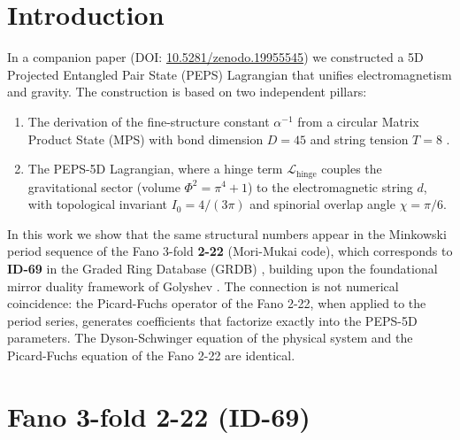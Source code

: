 \documentclass[12pt]{article}
\begin{document}
\tableofcontents

\newpage

\section{Introduction}

In a companion paper \cite{peps5d} (DOI: \href{https://doi.org/10.5281/zenodo.19955545}{10.5281/zenodo.19955545})
we constructed a 5D Projected Entangled Pair State (PEPS) Lagrangian that unifies
electromagnetism and gravity. The construction is based on two independent
pillars:

\begin{enumerate}
  \item The derivation of the fine-structure constant $\alpha^{-1}$ from a
        circular Matrix Product State (MPS) with bond dimension $D = 45$ and
        string tension $T = 8$ \cite{alpha_series}.
  \item The PEPS-5D Lagrangian, where a hinge term $\mathcal{L}_{\text{hinge}}$
        couples the gravitational sector (volume $\Phi^2 = \pi^4 + 1$) to the
        electromagnetic string $d$, with topological invariant $I_0 = 4/(3\pi)$
        and spinorial overlap angle $\chi = \pi/6$.
\end{enumerate}

In this work we show that the same structural numbers appear in the
Minkowski period sequence of the Fano 3-fold \textbf{2-22} (Mori-Mukai code),
which corresponds to \textbf{ID-69} in the Graded Ring Database (GRDB)
\cite{coates2013,grdb}, building upon the foundational mirror duality
framework of Golyshev \cite{golyshev2007}. The connection is not numerical
coincidence: the Picard-Fuchs operator of the Fano 2-22, when applied to the
period series, generates coefficients that factorize exactly into the PEPS-5D
parameters. The Dyson-Schwinger equation of the physical system and the
Picard-Fuchs equation of the Fano 2-22 are identical.

\section{Fano 3-fold 2-22 (ID-69)}
\end{document}
